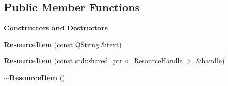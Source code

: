 \subsection*{Public Member Functions}
\begin{Indent}\textbf{ Constructors and Destructors}\par
\begin{DoxyCompactItemize}
\item 
\mbox{\label{classrev_1_1_view_1_1_resource_item_a80257c2d601a02ef7ce40e2e6c89bca5}} 
{\bfseries Resource\+Item} (const Q\+String \&text)
\item 
\mbox{\label{classrev_1_1_view_1_1_resource_item_a6f98f9aab64d2a9a4e3b06e822b204ed}} 
{\bfseries Resource\+Item} (const std\+::shared\+\_\+ptr$<$ \mbox{\hyperlink{classrev_1_1_resource_handle}{Resource\+Handle}} $>$ \&handle)
\item 
\mbox{\label{classrev_1_1_view_1_1_resource_item_a7d93bfa96791485c73a52f8da76d5c8b}} 
{\bfseries $\sim$\+Resource\+Item} ()
\end{DoxyCompactItemize}
\end{Indent}
